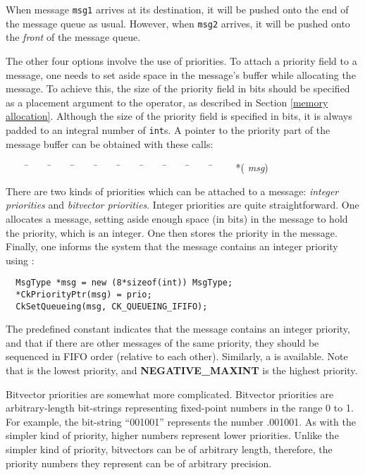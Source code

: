 When message {\tt msg1} arrives at its destination, it will be pushed
onto the end of the message queue as usual.  However, when {\tt msg2}
arrives, it will be pushed onto the {\it front} of the message queue.

The other four options involve the use of
priorities.  To attach a priority field to a
message, one needs to set aside space in the message's buffer while
allocating the message.  To achieve this, the
size of the priority field in bits should be
specified as a placement argument to the  operator, as
described in Section \ref{memory allocation}.  Although the size of
the priority field is specified in bits, it is always padded to an
integral number of {\tt int}s.  A pointer to the priority part of the
message buffer can be obtained with these calls:

\begin{tabbing}
~~~~ \=~~~~ \=~~~~ \=~~~~ \=~~~~ \=~~~~ \=~~~~ \=~~~~ \=~~~~ \=~~~~ \kill
\>  *( {\it msg}) \\
\end{tabbing}

There are two kinds of priorities which can be attached to a message:
{\sl integer priorities} and {\sl bitvector
priorities}.  Integer priorities are quite
straightforward.  One allocates a message, setting aside enough space
(in bits) in the message to hold the priority, which is an integer.
One then stores the priority in the message.  Finally, one informs the
system that the message contains an integer priority using
:

\begin{verbatim}
  MsgType *msg = new (8*sizeof(int)) MsgType;
  *CkPriorityPtr(msg) = prio;
  CkSetQueueing(msg, CK_QUEUEING_IFIFO);
\end{verbatim}

The predefined constant   indicates that the
message contains an integer priority, and that if there are other
messages of the same priority, they should be sequenced in FIFO order
(relative to each other).  Similarly, a   is
available.  Note that   is the lowest priority, and {\bf
NEGATIVE\_MAXINT} is the highest priority.

Bitvector priorities are somewhat more complicated.  Bitvector
priorities are arbitrary-length bit-strings representing fixed-point
numbers in the range 0 to 1.  For example, the bit-string ``001001''
represents the number .001001\raisebox{-.5ex}{\scriptsize binary}.  As
with the simpler kind of priority, higher numbers represent lower
priorities.  Unlike the simpler kind of priority, bitvectors can be of
arbitrary length, therefore, the priority numbers they represent can
be of arbitrary precision.

